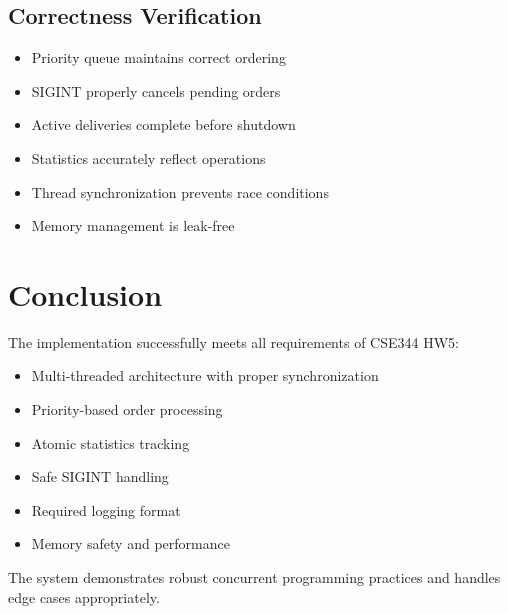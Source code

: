 \documentclass[12pt,a4paper]{article}
\begin{document}
\subsection{Correctness Verification}

\begin{itemize}
    \item \checkmark Priority queue maintains correct ordering
    \item \checkmark SIGINT properly cancels pending orders
    \item \checkmark Active deliveries complete before shutdown
    \item \checkmark Statistics accurately reflect operations
    \item \checkmark Thread synchronization prevents race conditions
    \item \checkmark Memory management is leak-free
\end{itemize}

\section{Conclusion}

The implementation successfully meets all requirements of CSE344 HW5:

\begin{itemize}
    \item Multi-threaded architecture with proper synchronization
    \item Priority-based order processing
    \item Atomic statistics tracking
    \item Safe SIGINT handling
    \item Required logging format
    \item Memory safety and performance
\end{itemize}

The system demonstrates robust concurrent programming practices and handles edge cases appropriately.
\end{document}
